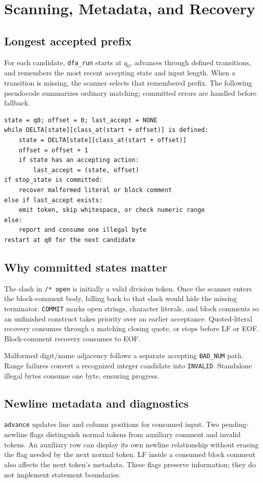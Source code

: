 \documentclass[11pt,a4paper]{article}
\newcommand{\code}[1]{\texttt{#1}}
\begin{document}
\clearpage
\section{Scanning, Metadata, and Recovery}
\subsection{Longest accepted prefix}
For each candidate, \code{dfa\_run} starts at $q_0$, advances through defined
transitions, and remembers the most recent accepting state and input length.
When a transition is missing, the scanner selects that remembered prefix.
The following pseudocode summarizes ordinary matching; committed errors are
handled before fallback.
\begin{lstlisting}
state = q0; offset = 0; last_accept = NONE
while DELTA[state][class_at(start + offset)] is defined:
    state = DELTA[state][class_at(start + offset)]
    offset = offset + 1
    if state has an accepting action:
        last_accept = (state, offset)
if stop_state is committed:
    recover malformed literal or block comment
else if last_accept exists:
    emit token, skip whitespace, or check numeric range
else:
    report and consume one illegal byte
restart at q0 for the next candidate
\end{lstlisting}

\subsection{Why committed states matter}
The slash in \code{/* open} is initially a valid division token. Once the
scanner enters the block-comment body, falling back to that slash would hide
the missing terminator. \code{COMMIT} marks open strings, character literals,
and block comments so an unfinished construct takes priority over an earlier
acceptance. Quoted-literal recovery consumes through a matching closing quote,
or stops before LF or EOF. Block-comment recovery consumes to EOF.

Malformed digit/name adjacency follows a separate accepting \code{BAD\_NUM}
path. Range failures convert a recognized integer candidate into
\code{INVALID}. Standalone illegal bytes consume one byte, ensuring progress.

\subsection{Newline metadata and diagnostics}
\code{advance} updates line and column positions for consumed input. Two
pending-newline flags distinguish normal tokens from auxiliary comment and
invalid tokens. An auxiliary row can display its own newline relationship
without erasing the flag needed by the next normal token. LF inside a consumed
block comment also affects the next token's metadata. These flags preserve
information; they do not implement statement boundaries.
\end{document}
